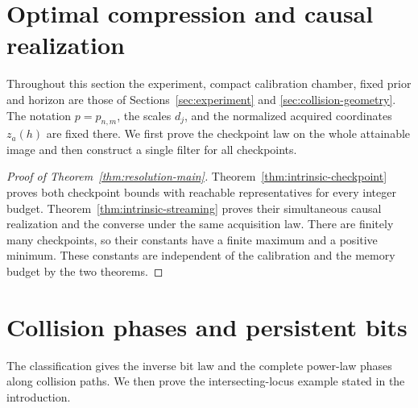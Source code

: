 \section{Optimal compression and causal realization}\label{sec:direct-classification}
Throughout this section the experiment, compact calibration chamber,
fixed prior and horizon are those of Sections~\ref{sec:experiment} and
\ref{sec:collision-geometry}. The notation $p=p_{n,m}$, the scales
$d_j$, and the normalized acquired coordinates $z_a(h)$ are fixed there.
We first prove the checkpoint law on the whole attainable image and
then construct a single filter for all checkpoints.

\begin{proof}[Proof of Theorem~\ref{thm:resolution-main}]
Theorem~\ref{thm:intrinsic-checkpoint} proves both checkpoint bounds
with reachable representatives for every integer budget.
Theorem~\ref{thm:intrinsic-streaming} proves their simultaneous causal
realization and the converse under the same acquisition law. There
are finitely many checkpoints, so their constants have a finite
maximum and a positive minimum. These constants are independent of
the calibration and the memory budget by the two theorems.
\end{proof}
\section{Collision phases and persistent bits}\label{sec:collision-phases}
The classification gives the inverse bit law and the complete power-law
phases along collision paths. We then prove the intersecting-locus
example stated in the introduction.



